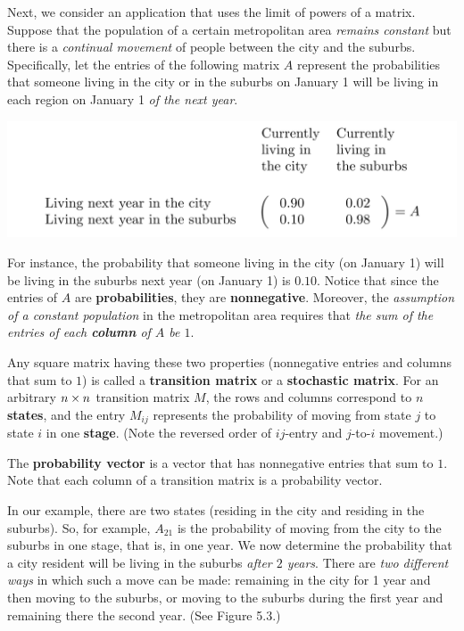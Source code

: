 Next, we consider an application that uses the limit of powers of a matrix.
Suppose that the population of a certain metropolitan area \emph{remains constant} but there is a \emph{continual movement} of people between the city and the suburbs.
Specifically, let the entries of the following matrix \(A\) represent the probabilities that someone living in the city or in the suburbs on January 1 will be living in each region on January 1 \emph{of the next year}.

\includegraphics[width=16cm]{images/5-3-city-suburb-movement.png}

For instance, the probability that someone living in the city (on January 1) will be living in the suburbs next year (on January 1) is \(0.10\).
Notice that since the entries of \(A\) are \textbf{probabilities}, they are \textbf{nonnegative}.
Moreover, the \emph{assumption of a constant population} in the metropolitan area requires that \emph{the sum of the entries of each \textbf{column} of \(A\) be \(1\)}.

\begin{additional definition} \label{adef 5.3}
Any square matrix having these two properties (nonnegative entries and columns that sum to \(1\)) is called a \textbf{transition matrix} or a \textbf{stochastic matrix}.
For an arbitrary \(n \times n\) transition matrix \(M\), the rows and columns correspond to \(n\) \textbf{states}, and the entry \(M_{ij}\) represents the probability of moving from state \(j\) to state \(i\) in one \textbf{stage}.
(Note the reversed order of \(ij\)-entry and \(j\)-to-\(i\) movement.)

The \textbf{probability vector} is a vector that has nonnegative entries that sum to \(1\).
Note that each column of a transition matrix is a probability vector.
\end{additional definition}

In our example, there are two states (residing in the city and residing in the suburbs).
So, for example, \(A_{21}\) is the probability of moving from the city to the suburbs in one stage, that is, in one year.
We now determine the probability that a city resident will be living in the suburbs \emph{after \(2\) years}.
There are \emph{two different ways} in which such a move can be made:
remaining in the city for 1 year and then moving to the suburbs, or moving to the suburbs during the first year and remaining there the second year.
(See Figure 5.3.)

